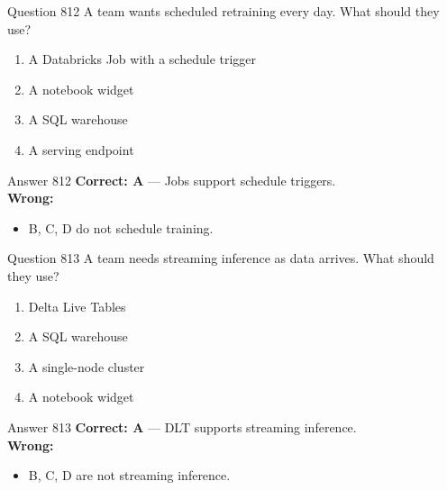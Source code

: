 \documentclass[aspectratio=169,11pt]{beamer}
\begin{document}
	\begin{frame}{Question 812}
		A team wants scheduled retraining every day. What should they use?
		\begin{enumerate}[label=\Alph*.]
			\item A Databricks Job with a schedule trigger
			\item A notebook widget
			\item A SQL warehouse
			\item A serving endpoint
		\end{enumerate}
	\end{frame}
	\begin{frame}{Answer 812}
		\textbf{Correct: A} --- Jobs support schedule triggers.\\
		\vspace{0.5em}
		\textbf{Wrong:}
		\begin{itemize}
			\item B, C, D do not schedule training.
		\end{itemize}
	\end{frame}
	
	\begin{frame}{Question 813}
		A team needs streaming inference as data arrives. What should they use?
		\begin{enumerate}[label=\Alph*.]
			\item Delta Live Tables
			\item A SQL warehouse
			\item A single-node cluster
			\item A notebook widget
		\end{enumerate}
	\end{frame}
	\begin{frame}{Answer 813}
		\textbf{Correct: A} --- DLT supports streaming inference.\\
		\vspace{0.5em}
		\textbf{Wrong:}
		\begin{itemize}
			\item B, C, D are not streaming inference.
		\end{itemize}
	\end{frame}
	
\end{document}
